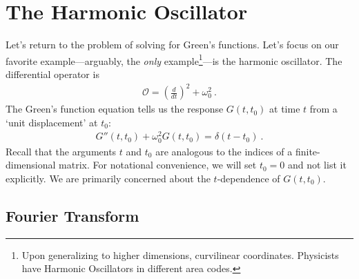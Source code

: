 
\section{The Harmonic Oscillator}

Let's return to the problem of solving for Green's functions. Let's focus on our favorite example---arguably, the \emph{only} example\footnote{Upon generalizing to higher dimensions, curvilinear coordinates. Physicists have Harmonic Oscillators in different area codes.}---is the harmonic oscillator. The differential operator is
\begin{align}
	\mathcal O = \left(\frac{d}{dt}\right)^2 + \omega_0^2 \ .
	\label{eq:O:HO}
\end{align}
The Green's function equation tells us the response $G(t,t_0)$ at time $t$ from a `unit displacement' at $t_0$:
\begin{align}
	G''(t,t_0) + \omega_0^2 G(t,t_0) = \delta(t-t_0) \ .
	\label{eq:HO:Greens:eqn}
\end{align}
Recall that the arguments $t$ and $t_0$ are analogous to the indices of a finite-dimensional matrix. For notational convenience, we will set $t_0=0$ and not list it explicitly. We are primarily concerned about the $t$-dependence of $G(t,t_0)$. 

\subsection{Fourier Transform}


